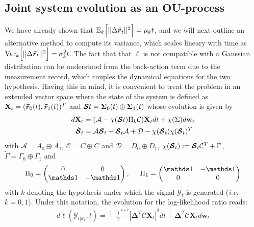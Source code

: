 \subsection{Joint system evolution as an OU-process}\label{ssec:oucoupled}
We have already shown that $\mathbb{E}_{k}\Big[||\Delta \bm{\bar{r}}_t||^2\Big]= \mu_k t$, and we will next outline an alternative method to compute its variance, which scales lineary with time as $\text{Var}_k\Big[||\Delta \bm{\bar{r}}_t||^2\Big]= \sigma^2_k t$. The fact that that $\ell$ is not compatible with a Gaussian distribution can be understood from the back-action term due to the measurement record, which couples the dynamical equations for the two hypothesis. Having this in mind, it is convenient to treat the problem in an extended vector space where the state of the system is defined as $\mathbf{X}_{t}=(\bm{\bar{r}}_{0}(t),\bm{\bar{r}}_{1}(t))^{T}$ and $\bm{\mathcal{S}}{t} =\bm{\Sigma}_{0}(t)\oplus\bm{\Sigma}_{1}(t)$ whose evolution is given by
\begin{align}
d\mathbf{X}_{t} &=  (\mathcal{A} -\chi(\bm{\mathcal{S}}{t}) \Pi_{k} \mathcal{C}) {\mathbf{X}}_{t} dt +\chi(\Sigma) d\mathbf{w}_{t}\nonumber\\
\dot{\bm{\mathcal{S}}}_t &= \mathcal{A} \bm{\mathcal{S}}_t+\bm{\mathcal{S}}_t \mathcal{A} +\mathcal{D}-\chi(\bm{\mathcal{S}}_{t})\chi(\bm{\mathcal{S}}_{t})^{T}
\end{align}
with $\mathcal{A}=A_{0}\oplus A_{1}$, $\mathcal{C}=C\oplus C$ and $\mathcal{D}= D_{0}\oplus D_{1}$, $\chi(\bm{\mathcal{S}}_{t}) := \bm{\mathcal{S}}_{t} \mathcal{C}^T +\tilde{\Gamma}$, $\tilde{\Gamma}= \Gamma_{0}\oplus\Gamma_{1}$
and
\begin{align*}
  \Pi_{0}=\begin{pmatrix}
    0 & 0\\
  \one & -\one
   \end{pmatrix},
   \hspace{0,5cm}
   \Pi_{1}=\begin{pmatrix}
  \one & -\one\\
    0   &   0
   \end{pmatrix}
  \end{align*}
with $k$ denoting the hypothesis under which the signal $\mathcal{Y}_{t}$ is generated (\textit{i.e.} $k=0,1$). Under this notation, the evolution for the log-likelihood ratio reads:
\begin{align}
d\ell(\mathcal{Y}_{t|\theta_{k}},t) =\frac{(-)^{k+1}}{2} |\mathbf{\Delta}^{T}\mathcal{C}{\mathbf{X}_{t}} |^2 dt + \mathbf{\Delta}^{T}\mathcal{C}{\mathbf{X}_{t}} d\mathbf{w}_{t}
\end{align}

